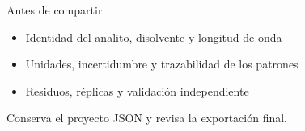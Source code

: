 \documentclass[aspectratio=169,11pt]{beamer}
\begin{document}
\begin{frame}{Antes de compartir}
  \transdissolve[duration=0.25]
  \begin{itemize}
    \item Identidad del analito, disolvente y longitud de onda
    \item Unidades, incertidumbre y trazabilidad de los patrones
    \item Residuos, réplicas y validación independiente
  \end{itemize}
  \medskip

  {\small Conserva el proyecto JSON y revisa la exportación final.}
\end{frame}
\end{document}
